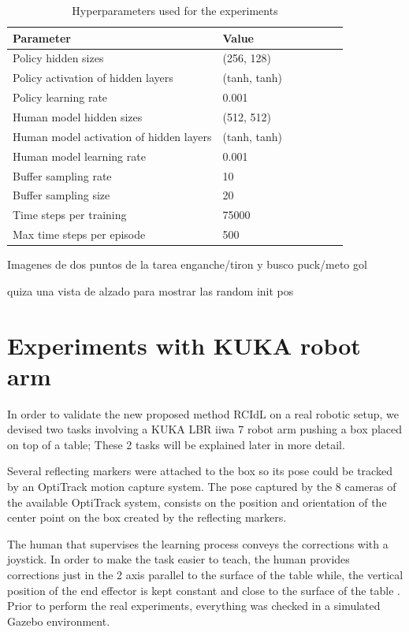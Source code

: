 \begin{table}[H]
\centering
\renewcommand{\arraystretch}{1.4}
\begin{tabular}{llS[table-format=2.2]SSS[table-format=2.2]S[table-format=2.2]}
\toprule
\textbf{Parameter }& \textbf{Value}\\[-.4em]
\midrule
Policy hidden sizes  &   (256, 128)\\
Policy activation of hidden layers  &   (tanh, tanh)\\
Policy learning rate  &  0.001\\
Human model hidden sizes &   (512, 512)\\
Human model activation of hidden layers  &   (tanh, tanh)\\
Human model learning rate  &   0.001\\
Buffer sampling rate&   10\\
Buffer sampling size &   20\\
Time steps per training &   75000\\
Max time steps per episode &   500\\
\bottomrule
\end{tabular}
\caption{Hyperparameters used for the experiments}
\label{tab:hyperparameters}
\end{table}

Imagenes de dos puntos de la tarea enganche/tiron y busco puck/meto gol

quiza una vista de alzado para mostrar las random init pos


\section{Experiments with KUKA robot arm}
\label{section:Experiments with KUKA robot arm}

In order to validate the new proposed method RCIdL on a real robotic setup, we devised two tasks involving a KUKA LBR iiwa 7 robot arm pushing a box placed on top of a table; These 2 tasks will be explained later in more detail.

Several reflecting markers were attached to the box so its pose could be tracked by an OptiTrack motion capture system. The pose captured by the 8 cameras of the available OptiTrack system, consists on the position and orientation of the center point on the box created by the reflecting markers. 

The human that supervises the learning process conveys the corrections with a joystick. In order to make the task easier to teach, the human provides corrections just in the 2 axis parallel to the surface of the table while, the vertical position of the end effector is kept constant and close to the surface of the table . Prior to perform the real experiments, everything was checked in a simulated Gazebo environment.

